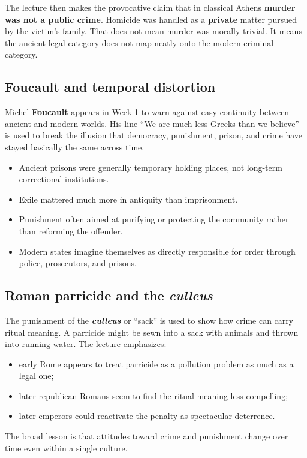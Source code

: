\documentclass[11pt]{article}
\newcommand{\keyterm}[1]{\textbf{#1}}
\begin{document}
The lecture then makes the provocative claim that in classical Athens \keyterm{murder was not a public crime}. Homicide was handled as a \keyterm{private} matter pursued by the victim's family. That does not mean murder was morally trivial. It means the ancient legal category does not map neatly onto the modern criminal category.

\subsection*{Foucault and temporal distortion}
Michel \keyterm{Foucault} appears in Week 1 to warn against easy continuity between ancient and modern worlds. His line ``We are much less Greeks than we believe'' is used to break the illusion that democracy, punishment, prison, and crime have stayed basically the same across time.

\begin{itemize}
\item Ancient prisons were generally temporary holding places, not long-term correctional institutions.
\item Exile mattered much more in antiquity than imprisonment.
\item Punishment often aimed at purifying or protecting the community rather than reforming the offender.
\item Modern states imagine themselves as directly responsible for order through police, prosecutors, and prisons.
\end{itemize}

\subsection*{Roman parricide and the \textit{culleus}}
The punishment of the \keyterm{\textit{culleus}} or ``sack'' is used to show how crime can carry ritual meaning. A parricide might be sewn into a sack with animals and thrown into running water. The lecture emphasizes:

\begin{itemize}
\item early Rome appears to treat parricide as a pollution problem as much as a legal one;
\item later republican Romans seem to find the ritual meaning less compelling;
\item later emperors could reactivate the penalty as spectacular deterrence.
\end{itemize}

The broad lesson is that attitudes toward crime and punishment change over time even within a single culture.
\end{document}
